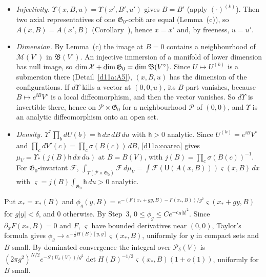\begin{detail}
\begin{step}
\begin{itemize}
\item \emph{Injectivity.} $\Upsilon(x,B,u)=\Upsilon(x',B',u')$ gives $B=B'$ (apply $(\cdot)^{(k)}$). Then two axial representatives of one $\mathfrak G_0$-orbit are equal (Lemma~(c)), so $A(x,B)=A(x',B)$ (Corollary~), hence $x=x'$ and, by freeness, $u=u'$.
\item \emph{Dimension.} By Lemma~(c) the image at $B=0$ contains a neighbourhood of $\mathscr M(V^\circ)$ in $\mathfrak B(V^\circ)$. An injective immersion of a manifold of lower dimension has null image, so $\dim\mathcal X+\dim\mathfrak G_0=\dim\mathfrak B(V^\circ)$. Since $U\mapsto U^{(k)}$ is a submersion there (Detail~\ref{d11a:A5}), $(x,B,u)$ has the dimension of the configurations. If $d\Upsilon$ kills a vector at $(0,0,u)$, its $B$-part vanishes, because $B\mapsto e^{\ii B}V^\circ$ is a local diffeomorphism, and then the vector vanishes. So $d\Upsilon$ is invertible there, hence on $\mathcal P\times\mathfrak G_0$ for a neighbourhood $\mathcal P$ of $(0,0)$, and $\Upsilon$ is an analytic diffeomorphism onto an open set.
\item \emph{Density.} $\Upsilon^*\prod_bdU(b)=\mathsf h\,dx\,dB\,du$ with $\mathsf h>0$ analytic. Since $U^{(k)}=e^{\ii B}V^\circ$ and $\prod_cdV'(c)=\prod_c\sigma(B(c))\,dB$, \eqref{d11a:coarea} gives $\mu_V=\Upsilon_*(j(B)\mathsf h\,dx\,du)$ at $B=B(V)$, with $j(B)=\prod_c\sigma(B(c))^{-1}$. For $\mathfrak G_0$-invariant $\mathcal F$, $\int_{\Upsilon(\mathcal P\times\mathfrak G_0)}\mathcal F\,d\mu_V=\int\mathcal F(\mathsf U(A(x,B)))\varsigma(x,B)\,dx$ with $\varsigma=j(B)\int_{\mathfrak G_0}\mathsf h\,du>0$ analytic.
\end{itemize}
\end{step}
\begin{step}
Put $x_*=x_*(B)$ and $\phi_g(y,B)=e^{-(F(x_*+gy,B)-F(x_*,B))/g^2}\varsigma(x_*+gy,B)$ for $g|y|<\delta$, and $0$ otherwise. By Step~3, $0\le\phi_g\le Ce^{-c_H|y|^2}$. Since $\partial_xF(x_*,B)=0$ and $F$, $\varsigma$ have bounded derivatives near $(0,0)$, Taylor's formula gives $\phi_g\to e^{-\frac12H(B)[y,y]}\varsigma(x_*,B)$, uniformly for $y$ in compact sets and $B$ small. By dominated convergence the integral over $\mathcal P_\delta(V)$ is $(2\pi g^2)^{N/2}e^{-S(U_k(V))/g^2}\det H(B)^{-1/2}\varsigma(x_*,B)(1+o(1))$, uniformly for $B$ small.
\end{step}
\begin{step}
\begin{itemize}

\end{itemize}
\end{step}
\end{detail}
